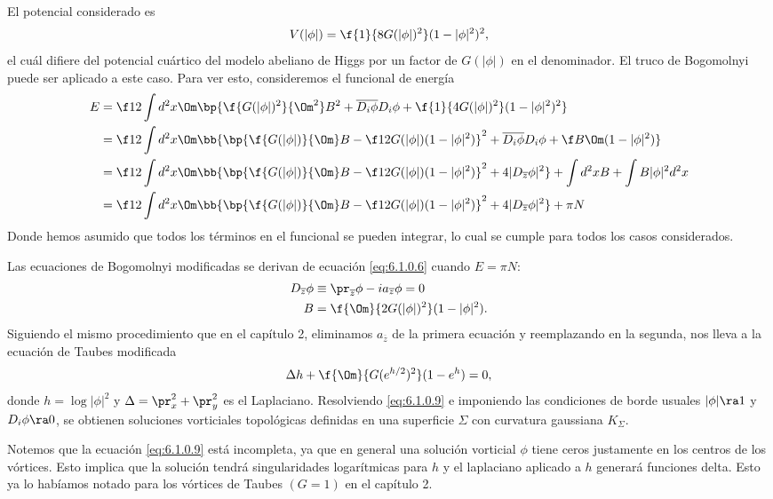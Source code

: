El potencial considerado es
\begin{align}
	V(|\phi|) = \f{1}{8G(|\phi|)^2}(1-|\phi|^2)^2,
\end{align}
el cuál difiere del potencial cuártico del modelo abeliano de Higgs por un factor de $G(|\phi|)$ en el denominador. El truco de Bogomolnyi puede ser aplicado a este caso. Para ver esto, consideremos el funcional de energía
\begin{align}
	E &= \f 12\int d^2x\Om\bp{\f{G(|\phi|)^2}{\Om^2}B^2+\overline{D_i\phi}D_i\phi+\f{1}{4G(|\phi|)^2}(1-|\phi|^2)^2}\\
	&=\f 12\int d^2x\Om\bb{\bp{\f{G(|\phi|)}{\Om}B-\f 1{2G(|\phi|)}(1-|\phi|^2)}^2+\overline{D_i\phi}D_i\phi+\f B{\Om}(1-|\phi|^2)}\\
	&=\f 12\int d^2x\Om\bb{\bp{\f{G(|\phi|)}{\Om}B-\f 1{2G(|\phi|)}(1-|\phi|^2)}^2+4|D_{\overline z}\phi|^2}+\int d^2x B+\int B|\phi|^2 d^2x\\
	&= \f 12\int d^2x\Om\bb{\bp{\f{G(|\phi|)}{\Om}B-\f 1{2G(|\phi|)}(1-|\phi|^2)}^2+4|D_{\overline z}\phi|^2}+\pi N \label{eq:6.1.0.6}
\end{align}
Donde hemos asumido que todos los términos en el funcional se pueden integrar, lo cual se cumple para todos los casos considerados.

Las ecuaciones de Bogomolnyi modificadas se derivan de ecuación \eqref{eq:6.1.0.6} cuando $E=\pi N$:
\begin{align}
	D_{\overline z}\phi &\equiv\pr_{\overline z}\phi-ia_{\overline z}\phi=0\\
	B &= \f{\Om}{2G(|\phi|)^2}(1-|\phi|^2).
\end{align}
Siguiendo el mismo procedimiento que en el capítulo 2, eliminamos $a_{\overline z}$ de la primera ecuación y reemplazando en la segunda, nos lleva a la ecuación de Taubes modificada
\begin{align}
	\Delta h+\f{\Om}{G(e^{h/2})^2}(1-e^h) =0, \label{eq:6.1.0.9}
\end{align}
donde $h=\log|\phi|^2$ y $\Delta=\pr_x^2+\pr_y^2$ es el Laplaciano. Resolviendo \eqref{eq:6.1.0.9} e imponiendo las condiciones de borde usuales $|\phi|\ra 1$ y $D_i\phi\ra 0$, se obtienen soluciones vorticiales topológicas definidas en una superficie $\Sigma$ con curvatura gaussiana $K_{\Sigma}$.

Notemos que la ecuación \eqref{eq:6.1.0.9} está incompleta, ya que en general una solución vorticial $\phi$ tiene ceros justamente en los centros de los vórtices. Esto implica que la solución tendrá singularidades logarítmicas para $h$ y el laplaciano aplicado a $h$ generará funciones delta. Esto ya lo habíamos notado para los vórtices de Taubes $(G=1)$ en el capítulo 2.

